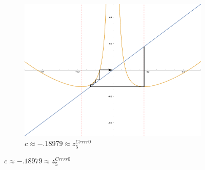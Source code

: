 \begin{figure}[ht]
\begin{subfigure}[b]{0.3\textwidth}
				\includegraphics[width=\textwidth]{./img/plot-018979}
				\caption{$c \approx - .18979 \approx z_5^{Crrrr0}$}
		\end{subfigure}


\end{figure}
